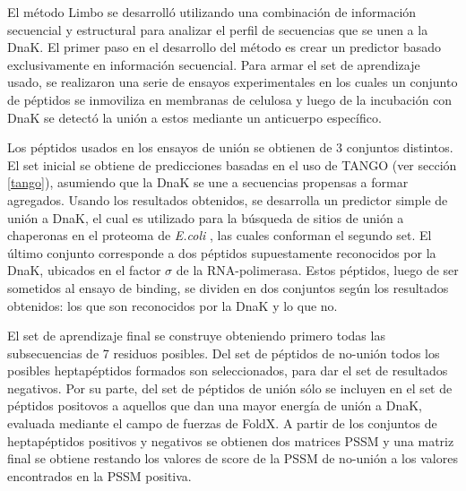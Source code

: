 El método Limbo se desarrolló utilizando una combinación de información secuencial y estructural para analizar el perfil de secuencias que se unen a la DnaK.
El primer paso en el desarrollo del método es crear un predictor basado exclusivamente en información secuencial.
Para armar el set de aprendizaje usado, se realizaron una serie de ensayos experimentales en los cuales un conjunto de péptidos se inmoviliza en membranas de celulosa 
y luego de la incubación con DnaK se detectó la unión a estos mediante un anticuerpo específico.

Los péptidos usados en los ensayos de unión se obtienen de 3 conjuntos distintos. El set inicial se obtiene de predicciones basadas en el uso de TANGO \cite{fernandez2004prediction} (ver sección \ref{tango}),
asumiendo que la DnaK se une a secuencias propensas a formar agregados.
Usando los resultados obtenidos, se desarrolla un predictor simple de unión a DnaK, el cual es utilizado para la búsqueda de sitios de unión a chaperonas en el proteoma de \textit{E.coli} 
, las cuales conforman el segundo set. El último conjunto corresponde a dos péptidos supuestamente reconocidos por la DnaK, ubicados en el factor $\sigma$ de la RNA-polimerasa.
Estos péptidos, luego de ser sometidos al ensayo de binding, se dividen en dos conjuntos según los resultados obtenidos:
los que son reconocidos por la DnaK y lo que no. 

El set de aprendizaje final se construye obteniendo primero todas las subsecuencias de 7 residuos posibles. 
Del set de péptidos de no-unión todos los posibles heptapéptidos formados son seleccionados, para dar el set de resultados negativos.
Por su parte, del set de péptidos de unión sólo se incluyen en el set de péptidos positovos a aquellos que dan una mayor energía de unión a DnaK, evaluada mediante el campo de fuerzas de FoldX.
A partir de los conjuntos de heptapéptidos positivos y negativos se obtienen dos matrices PSSM y una matriz final se obtiene restando los valores de score de la PSSM de no-unión a los valores encontrados en la PSSM positiva.

